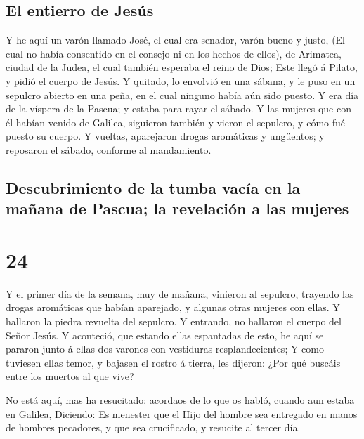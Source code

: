\hypertarget{el-entierro-de-jesuxfas}{%
\subsection{El entierro de Jesús}\label{el-entierro-de-jesuxfas}}

 Y he aquí un varón llamado José, el cual era senador,
varón bueno y justo,  (El cual no había consentido en el
consejo ni en los hechos de ellos), de Arimatea, ciudad de la Judea, el
cual también esperaba el reino de Dios;  Este llegó á
Pilato, y pidió el cuerpo de Jesús.  Y quitado, lo
envolvió en una sábana, y le puso en un sepulcro abierto en una peña, en
el cual ninguno había aún sido puesto.  Y era día de la
víspera de la Pascua; y estaba para rayar el sábado.  Y
las mujeres que con él habían venido de Galilea, siguieron también y
vieron el sepulcro, y cómo fué puesto su cuerpo.  Y
vueltas, aparejaron drogas aromáticas y ungüentos; y reposaron el
sábado, conforme al mandamiento.

\hypertarget{descubrimiento-de-la-tumba-vacuxeda-en-la-mauxf1ana-de-pascua-la-revelaciuxf3n-a-las-mujeres}{%
\subsection{Descubrimiento de la tumba vacía en la mañana de Pascua; la
revelación a las
mujeres}\label{descubrimiento-de-la-tumba-vacuxeda-en-la-mauxf1ana-de-pascua-la-revelaciuxf3n-a-las-mujeres}}

\hypertarget{section-23}{%
\section{24}\label{section-23}}

 Y el primer día de la semana, muy de mañana, vinieron al
sepulcro, trayendo las drogas aromáticas que habían aparejado, y algunas
otras mujeres con ellas.  Y hallaron la piedra revuelta
del sepulcro.  Y entrando, no hallaron el cuerpo del Señor
Jesús.  Y aconteció, que estando ellas espantadas de esto,
he aquí se pararon junto á ellas dos varones con vestiduras
resplandecientes;  Y como tuviesen ellas temor, y bajasen
el rostro á tierra, les dijeron: ¿Por qué buscáis entre los muertos al
que vive?

 No está aquí, mas ha resucitado: acordaos de lo que os
habló, cuando aun estaba en Galilea,  Diciendo: Es
menester que el Hijo del hombre sea entregado en manos de hombres
pecadores, y que sea crucificado, y resucite al tercer día.

